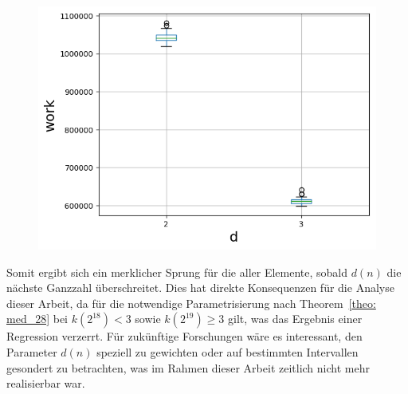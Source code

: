 \begin{figure}[H]
    \hspace*{.8cm}
    \begin{minipage}[t]{.30\textwidth}
        \centering
        \includegraphics[width=1.25\textwidth]{pictures/med_algo_theo28_comp_work.png}
    \end{minipage}
    \vspace*{-0.1cm}
    \label{fig: med_theo28_comp}
\end{figure}

\noindent
Somit ergibt sich ein merklicher Sprung für die \fg aller Elemente, sobald $d(n)$ die nächste Ganzzahl überschreitet. Dies hat direkte Konsequenzen für die Analyse dieser Arbeit, da für die notwendige Parametrisierung nach Theorem~\ref{theo: med_28} bei $k(2^{18}) <3$ sowie $k(2^{19}) \geq 3$ gilt, was das Ergebnis einer Regression verzerrt. Für zukünftige Forschungen wäre es interessant, den Parameter $d(n)$ speziell zu gewichten oder auf bestimmten Intervallen gesondert zu betrachten, was im Rahmen dieser Arbeit zeitlich nicht mehr realisierbar war.
